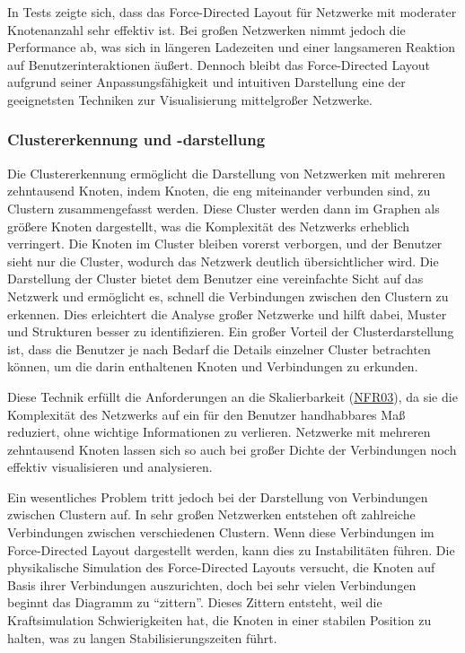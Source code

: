 In Tests zeigte sich, dass das Force-Directed Layout für Netzwerke mit moderater Knotenanzahl sehr effektiv ist. Bei großen Netzwerken nimmt jedoch die Performance ab, was sich in längeren Ladezeiten und einer langsameren Reaktion auf Benutzerinteraktionen äußert. Dennoch bleibt das Force-Directed Layout aufgrund seiner Anpassungsfähigkeit und intuitiven Darstellung eine der geeignetsten Techniken zur Visualisierung mittelgroßer Netzwerke.

\subsubsection{Clustererkennung und -darstellung}

Die Clustererkennung ermöglicht die Darstellung von Netzwerken mit mehreren zehntausend Knoten, indem Knoten, die eng miteinander verbunden sind, zu Clustern zusammengefasst werden. Diese Cluster werden dann im Graphen als größere Knoten dargestellt, was die Komplexität des Netzwerks erheblich verringert. Die Knoten im Cluster bleiben vorerst verborgen, und der Benutzer sieht nur die Cluster, wodurch das Netzwerk deutlich übersichtlicher wird. Die Darstellung der Cluster bietet dem Benutzer eine vereinfachte Sicht auf das Netzwerk und ermöglicht es, schnell die Verbindungen zwischen den Clustern zu erkennen. Dies erleichtert die Analyse großer Netzwerke und hilft dabei, Muster und Strukturen besser zu identifizieren. Ein großer Vorteil der Clusterdarstellung ist, dass die Benutzer je nach Bedarf die Details einzelner Cluster betrachten können, um die darin enthaltenen Knoten und Verbindungen zu erkunden.

Diese Technik erfüllt die Anforderungen an die Skalierbarkeit (\hyperref[NFR03]{NFR03}), da sie die Komplexität des Netzwerks auf ein für den Benutzer handhabbares Maß reduziert, ohne wichtige Informationen zu verlieren. Netzwerke mit mehreren zehntausend Knoten lassen sich so auch bei großer Dichte der Verbindungen noch effektiv visualisieren und analysieren.

Ein wesentliches Problem tritt jedoch bei der Darstellung von Verbindungen zwischen Clustern auf. In sehr großen Netzwerken entstehen oft zahlreiche Verbindungen zwischen verschiedenen Clustern. Wenn diese Verbindungen im Force-Directed Layout dargestellt werden, kann dies zu Instabilitäten führen. Die physikalische Simulation des Force-Directed Layouts versucht, die Knoten auf Basis ihrer Verbindungen auszurichten, doch bei sehr vielen Verbindungen beginnt das Diagramm zu \enquote{zittern}. Dieses Zittern entsteht, weil die Kraftsimulation Schwierigkeiten hat, die Knoten in einer stabilen Position zu halten, was zu langen Stabilisierungszeiten führt.

